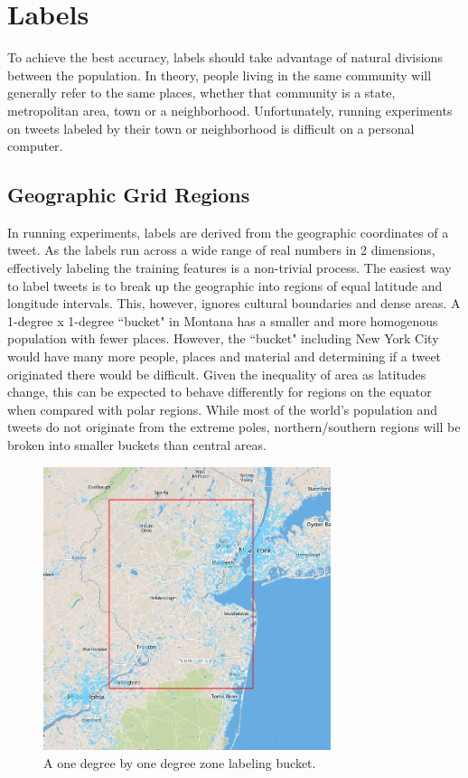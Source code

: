 \documentclass[midd]{thesis}
\begin{document}
\section{Labels}
To achieve the best accuracy, labels should take advantage of natural divisions between the population. In theory, people living in the same community will generally refer to the same places, whether that community is a state, metropolitan area, town or a neighborhood. Unfortunately, running experiments on tweets labeled by their town or neighborhood is difficult on a personal computer.

\subsection{Geographic Grid Regions}
In running experiments, labels are derived from the geographic coordinates of a tweet. As the labels run across a wide range of real numbers in 2 dimensions, effectively labeling the training features is a non-trivial process. The easiest way to label tweets is to break up the geographic into regions of equal latitude and longitude intervals. This, however, ignores cultural boundaries and dense areas. A 1-degree x 1-degree ``bucket" in Montana has a smaller and more homogenous population with fewer places. However, the ``bucket" including New York City would have many more people, places and material and determining if a tweet originated there would be difficult. Given the inequality of area as latitudes change, this can be expected to behave differently for regions on the equator when compared with polar regions. While most of the world's population and tweets do not originate from the extreme poles, northern/southern regions will be broken into smaller buckets than central areas.

\begin{figure}
\centering
\includegraphics[width=0.75\textwidth]{grid_zone.png}
\caption{A one degree by one degree zone labeling bucket.}
\label{fig:grid_zone}
\end{figure}
\end{document}
